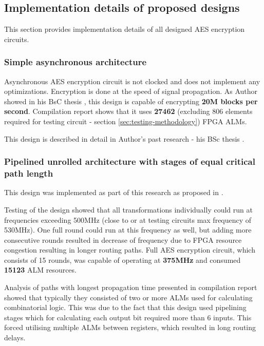 \subsection{Implementation details of proposed designs}
This section provides implementation details of all designed AES encryption circuits.

\subsubsection{Simple asynchronous architecture}
Asynchronous AES encryption circuit is not clocked and does not implement any optimizations. Encryption is done at the speed of signal propagation. As Author showed in his BsC thesis \cite{inzynierka}, this design is capable of encrypting \textbf{20M blocks per second}. Compilation report shows that it uses \textbf{27462} (excluding 806 elements required for testing circuit - section \ref{sec:testing-methodology}) FPGA ALMs.

This design is described in detail in Author's past research - his BSc thesis \cite{inzynierka}.

\subsubsection{Pipelined unrolled architecture with stages of equal critical path length}

This design was implemented as part of this research as proposed in \cite{vlsi}.

Testing of the design showed that all transformations individually could run at frequencies exceeding 500MHz (close to or at testing circuits max frequency of 530MHz). One full round could run at this frequency as well, but adding more consecutive rounds resulted in decrease of frequency due to FPGA resource congestion resulting in longer routing paths. Full AES encryption circuit, which consists of 15 rounds, was capable of operating at \textbf{375MHz} and consumed \textbf{15123} ALM resources.

Analysis of paths with longest propagation time presented in compilation report showed that typically they consisted of two or more ALMs used for calculating combinatorial logic. This was due to the fact that this design used pipelining stages which for calculating each output bit required more than 6 inputs. This forced utilising multiple ALMs between registers, which resulted in long routing delays.


